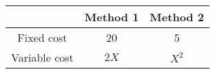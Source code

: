 \begin{tabular}{|c|c|c|}
\hline
 & Method 1 & Method 2 \\ \hline
Fixed cost & 20 & 5 \\ \hline
Variable cost & $2X$ & $X^{2}$ \\ \hline
\end{tabular}